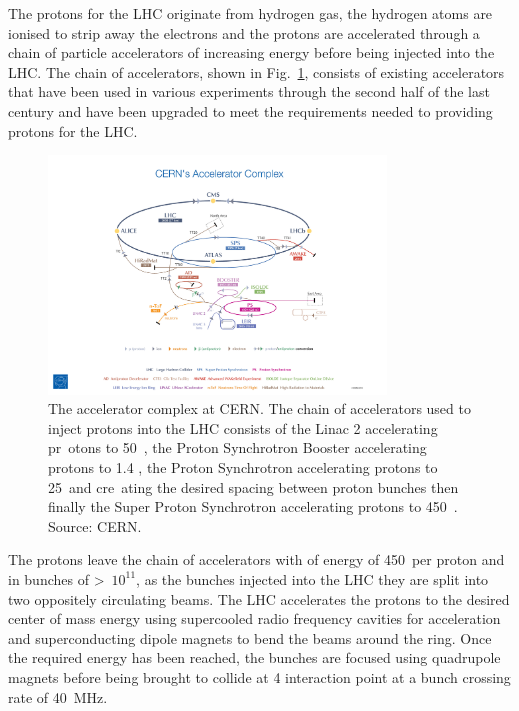 The protons for the LHC originate from hydrogen gas, %
the hydrogen atoms are ionised to strip away the electrons and the protons are accelerated through a chain of particle accelerators of increasing energy before being injected into the LHC. The chain of accelerators, shown in Fig.~\ref{fig:accelerator_chain}, consists of existing accelerators that have been used in various experiments through the second half of the last century and have been upgraded to meet the requirements needed to providing protons for the LHC. 
\begin{figure}[htbp!]
  \centering
  \includegraphics[trim = 125mm 2mm 125mm 90mm, clip, width=0.8\textwidth]{./Figs/LHC_LHCb/accelerator_complex.jpg}
  \caption{The accelerator complex at CERN. The chain of accelerators used to inject protons into the LHC consists of the Linac 2 accelerating pr\
otons to 50~\mev, the Proton Synchrotron Booster accelerating protons to 1.4 \gev, the Proton Synchrotron accelerating protons to 25~\gev and cre\
ating the desired spacing between proton bunches then finally the Super Proton Synchrotron accelerating protons to 450~\gev. Source: CERN.}
  \label{fig:accelerator_chain}
\end{figure}



The protons leave the chain of accelerators with of energy of 450~\gev per proton and in bunches of >~$10^{11}$, as the bunches injected into the LHC they are split into two oppositely circulating beams.
The LHC accelerates the protons to the desired center of mass energy using supercooled radio frequency cavities for acceleration and superconducting dipole magnets to bend the beams around the ring. %
Once the required energy has been reached, the bunches are focused using quadrupole magnets before being brought to collide at 4 interaction point at a bunch crossing rate of 40~MHz. 

